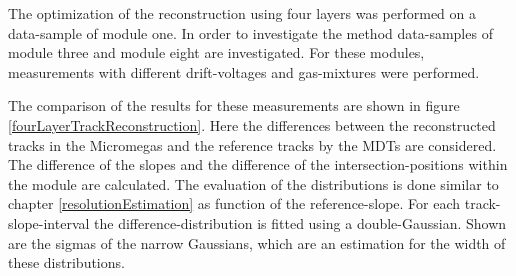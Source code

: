 \documentclass[
twoside,            %
BCOR1.4cm,          %
10pt,               %
headings=normal,    %
headsepline,        %
clearplainpage,		%
final,              %
div=14,
open=right,
bibliography=toc
]{scrreprt}
\begin{document}
The optimization of the reconstruction using four layers was performed on a data-sample of module one.
In order to investigate the method data-samples of module three and module eight are investigated.
For these modules, measurements with different drift-voltages and gas-mixtures were performed.


The comparison of the results for these measurements are shown in figure \ref{fourLayerTrackReconstruction}. 
Here the differences between the reconstructed tracks in the Micromegas and the reference tracks by the MDTs are considered.
The difference of the slopes and the difference of the intersection-positions within the module are calculated.
The evaluation of the distributions is done similar to chapter \ref{resolutionEstimation} as function of the reference-slope.
For each track-slope-interval the difference-distribution is fitted using a double-Gaussian.
Shown are the sigmas of the narrow Gaussians, which are an estimation for the width of these distributions.
\end{document}
